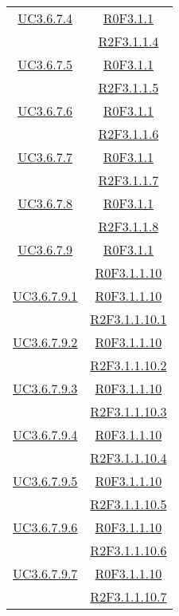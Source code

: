 \begin{longtable}{|c|c|}
\hline
\hyperlink{UC3.6.7.4}{UC3.6.7.4} & \hyperlink{R0F3.1.1}{R0F3.1.1}\\
& \hyperlink{R2F3.1.1.4}{R2F3.1.1.4}\\
\hline
\hyperlink{UC3.6.7.5}{UC3.6.7.5} & \hyperlink{R0F3.1.1}{R0F3.1.1}\\
& \hyperlink{R2F3.1.1.5}{R2F3.1.1.5}\\
\hline
\hyperlink{UC3.6.7.6}{UC3.6.7.6} & \hyperlink{R0F3.1.1}{R0F3.1.1}\\
& \hyperlink{R2F3.1.1.6}{R2F3.1.1.6}\\
\hline
\hyperlink{UC3.6.7.7}{UC3.6.7.7} & \hyperlink{R0F3.1.1}{R0F3.1.1}\\
& \hyperlink{R2F3.1.1.7}{R2F3.1.1.7}\\
\hline
\hyperlink{UC3.6.7.8}{UC3.6.7.8} & \hyperlink{R0F3.1.1}{R0F3.1.1}\\
& \hyperlink{R2F3.1.1.8}{R2F3.1.1.8}\\
\hline
\hyperlink{UC3.6.7.9}{UC3.6.7.9} & \hyperlink{R0F3.1.1}{R0F3.1.1}\\
& \hyperlink{R0F3.1.1.10}{R0F3.1.1.10}\\
\hline
\hyperlink{UC3.6.7.9.1}{UC3.6.7.9.1} & \hyperlink{R0F3.1.1.10}{R0F3.1.1.10}\\
& \hyperlink{R2F3.1.1.10.1}{R2F3.1.1.10.1}\\
\hline
\hyperlink{UC3.6.7.9.2}{UC3.6.7.9.2} & \hyperlink{R0F3.1.1.10}{R0F3.1.1.10}\\
& \hyperlink{R2F3.1.1.10.2}{R2F3.1.1.10.2}\\
\hline
\hyperlink{UC3.6.7.9.3}{UC3.6.7.9.3} & \hyperlink{R0F3.1.1.10}{R0F3.1.1.10}\\
& \hyperlink{R2F3.1.1.10.3}{R2F3.1.1.10.3}\\
\hline
\hyperlink{UC3.6.7.9.4}{UC3.6.7.9.4} & \hyperlink{R0F3.1.1.10}{R0F3.1.1.10}\\
& \hyperlink{R2F3.1.1.10.4}{R2F3.1.1.10.4}\\
\hline
\hyperlink{UC3.6.7.9.5}{UC3.6.7.9.5} & \hyperlink{R0F3.1.1.10}{R0F3.1.1.10}\\
& \hyperlink{R2F3.1.1.10.5}{R2F3.1.1.10.5}\\
\hline
\hyperlink{UC3.6.7.9.6}{UC3.6.7.9.6} & \hyperlink{R0F3.1.1.10}{R0F3.1.1.10}\\
& \hyperlink{R2F3.1.1.10.6}{R2F3.1.1.10.6}\\
\hline
\hyperlink{UC3.6.7.9.7}{UC3.6.7.9.7} & \hyperlink{R0F3.1.1.10}{R0F3.1.1.10}\\
& \hyperlink{R2F3.1.1.10.7}{R2F3.1.1.10.7}\\

\end{longtable}
